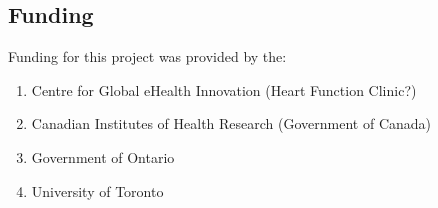 \documentclass[]{article}
\begin{document}
\subsection{Funding} %
Funding for this project was provided by the:
\begin{enumerate}[label=,itemsep=0mm]
	\item Centre for Global eHealth Innovation (Heart Function Clinic?)  %
	\item Canadian Institutes of Health Research (Government of Canada)
	\item Government of Ontario
	\item University of Toronto
\end{enumerate} 



\end{document}
